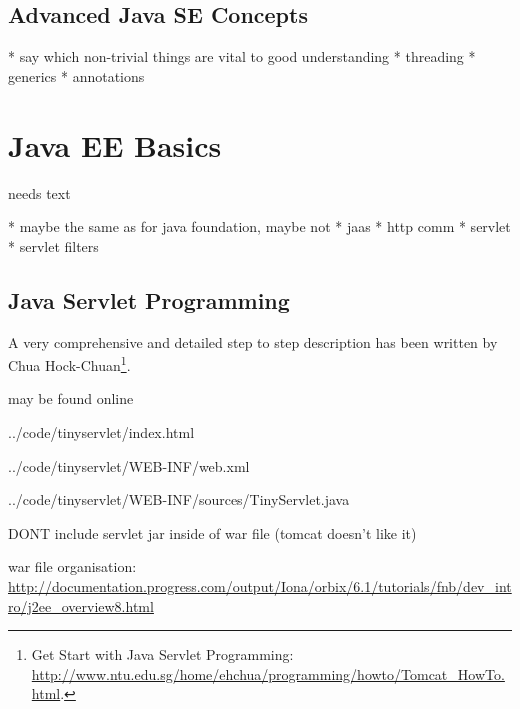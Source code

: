\documentclass[a4paper,10pt,twoside]{book}
\begin{document}
\subsection{Advanced Java SE Concepts}

  * say which non-trivial things are vital to good understanding
  * threading
  * generics
  * annotations

\section{Java EE Basics}


needs text

  * maybe the same as for java foundation, maybe not
  * jaas
  * http comm
  * servlet
  * servlet filters

\subsection{Java Servlet Programming}

A very comprehensive and detailed step to step description has been written by Chua Hock-Chuan\footnote{
Get Start with Java Servlet Programming: \url{http://www.ntu.edu.sg/home/ehchua/programming/howto/Tomcat_HowTo.html}.
}.

may be found online


{../code/tinyservlet/index.html}


{../code/tinyservlet/WEB-INF/web.xml}


{../code/tinyservlet/WEB-INF/sources/TinyServlet.java}

DONT include servlet jar inside of war file (tomcat doesn't like it)

war file organisation: \url{http://documentation.progress.com/output/Iona/orbix/6.1/tutorials/fnb/dev_intro/j2ee_overview8.html}


\ifx\wholebook\relax\else
   
   
\end{document}
